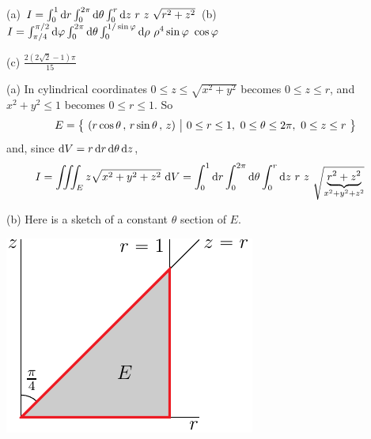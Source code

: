 \begin{answer}
(a) $I = \int_0^1\dee{r} \int_0^{2\pi}\dee{\theta} \int_0^r\dee{z}\ 
           r\ z\ \sqrt{r^2+z^2}$\qquad
(b) $I = \int_{\pi/4}^{\pi/2}\dee{\varphi} 
                \int_0^{2\pi}\dee{\theta} 
                \int_0^{1/\sin\varphi}\dee{\rho}\ 
                \rho^4\sin\varphi \ \cos\varphi$ 

(c) $\frac{2(2\sqrt{2}-1)\pi}{15}$
\end{answer}

\begin{solution}
(a) In cylindrical coordinates $0\le z\le \sqrt{x^2+y^2}$ becomes
$0\le z\le r$, and $x^2+y^2\le 1$ becomes $0\le r\le 1$. So
\begin{equation*}
E = \big\{ \ (r\cos\theta\,,\,r\sin\theta\,,\,z)\ \big|\ 0\le r\le 1,\ 0\le\theta\le 2\pi,
              \ 0\le z\le r\ \big\}
\end{equation*}
and, since $\mathrm{d}V = r\,\mathrm{d}r\,\mathrm{d}\theta\,\mathrm{d}z$,
\begin{align*}
I &= \tripInt_E z \sqrt{x^2 + y^2 + z^2}\  \dee{V} 
  = \int_0^1\dee{r} \int_0^{2\pi}\dee{\theta} \int_0^r\dee{z}\ 
           r\ z\ \sqrt{\underbrace{r^2+z^2}_{x^2+y^2+z^2}}
\end{align*} 

(b)
Here is a sketch of a constant $\theta$ section of $E$.

\begin{center}
     \includegraphics{fig/OE14A_8.pdf}
\end{center}


\end{solution}
